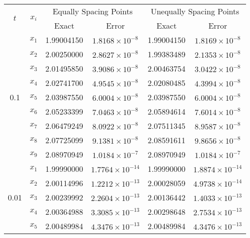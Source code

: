 \begin{example}
	
	\begin{table}[H]
		\renewcommand{\arraystretch}{1.5}
		\centering
		\begin{english}
\begin{tabular}{|c|c|c|c|c|c|}
			\hline
			\multirow{2}{*}{\( t \)} & \multirow{2}{*}{\( x_i \)} & \multicolumn{2}{c|}{Equally Spacing Points} & \multicolumn{2}{c|}{Unequally Spacing Points} \\
			\cline{3-6}
			& & Exact & Error & Exact & Error \\
			\hline
			\multirow{9}{*}{0.1} & \( x_1 \) & 1.99004150 & \( 1.8168 \times 10^{-8} \) & 1.99004150 & \( 1.8169 \times 10^{-8} \) \\
			& \( x_2 \) & 2.00250000 & \( 2.8627 \times 10^{-8} \) & 1.99383489 & \( 2.1353 \times 10^{-8} \) \\
			& \( x_3 \) & 2.01495850 & \( 3.9086 \times 10^{-8} \) & 2.00463754 & \( 3.0422 \times 10^{-8} \) \\
			& \( x_4 \) & 2.02741700 & \( 4.9545 \times 10^{-8} \) & 2.02080485 & \( 4.3994 \times 10^{-8} \) \\
			& \( x_5 \) & 2.03987550 & \( 6.0004 \times 10^{-8} \) & 2.03987550 & \( 6.0004 \times 10^{-8} \) \\
			& \( x_6 \) & 2.05233399 & \( 7.0463 \times 10^{-8} \) & 2.05894614 & \( 7.6014 \times 10^{-8} \) \\
			& \( x_7 \) & 2.06479249 & \( 8.0922 \times 10^{-8} \) & 2.07511345 & \( 8.9587 \times 10^{-8} \) \\
			& \( x_8 \) & 2.07725099 & \( 9.1381 \times 10^{-8} \) & 2.08591611 & \( 9.8656 \times 10^{-8} \) \\
			& \( x_9 \) & 2.08970949 & \( 1.0184 \times 10^{-7} \) & 2.08970949 & \( 1.0184 \times 10^{-7} \) \\
			\hline
			\multirow{9}{*}{0.01} & \( x_1 \) & 1.99990000 & \( 1.7764 \times 10^{-14} \) & 1.99990000 & \( 1.8874 \times 10^{-14} \) \\
			& \( x_2 \) & 2.00114996 & \( 1.2212 \times 10^{-13} \) & 2.00028059 & \( 4.9738 \times 10^{-14} \) \\
			& \( x_3 \) & 2.00239992 & \( 2.2604 \times 10^{-13} \) & 2.00136442 & \( 1.4033 \times 10^{-13} \) \\
			& \( x_4 \) & 2.00364988 & \( 3.3085 \times 10^{-13} \) & 2.00298648 & \( 2.7534 \times 10^{-13} \) \\
			& \( x_5 \) & 2.00489984 & \( 4.3476 \times 10^{-13} \) & 2.00489984 & \( 4.3476 \times 10^{-13} \) \\

\end{tabular}
\end{english}
\end{table}
\end{example}
